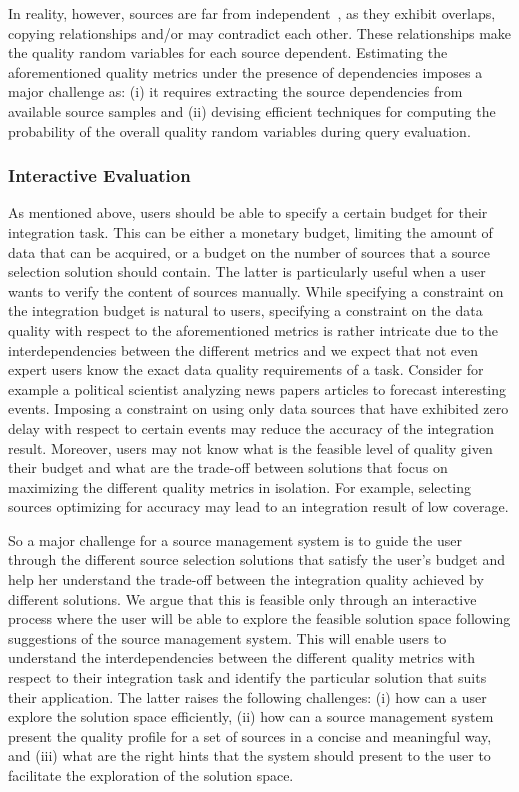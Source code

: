 \documentclass{sig-alternate}
\begin{document}
In reality, however, sources are far from independent~\cite{berti-equille:sailing, dong:2009}, as they exhibit overlaps, copying relationships and/or may contradict each other. These relationships make the quality random variables for each source dependent. Estimating the aforementioned quality metrics under the presence of dependencies imposes a major challenge as: (i) it  requires extracting the source dependencies from available source samples and (ii) devising efficient techniques for computing the probability of the overall quality random variables during query evaluation.

\subsubsection{Interactive Evaluation}
\label{sec:eval}
As mentioned above, users should be able to specify a certain budget for their integration task. This can be either a monetary budget, limiting the amount of data that can be acquired, or a budget on the number of sources that a source selection solution should contain. The latter is particularly useful when a user wants to verify the content of sources manually. While specifying a constraint on the integration budget is natural to users, specifying a constraint on the data quality with respect to the aforementioned metrics is rather intricate due to the interdependencies between the different metrics and we expect that not even expert users know the exact data quality requirements of a task. Consider for example a political scientist analyzing news papers articles to forecast interesting events. Imposing a constraint on using only data sources that have exhibited zero delay with respect to certain events may reduce the accuracy of the integration result. Moreover, users may not know what is the feasible level of quality given their budget and what are the trade-off between solutions that focus on maximizing the different quality metrics in isolation. For example, selecting sources optimizing for accuracy may lead to an integration result of low coverage.  

So a major challenge for a source management system is to guide the user through the different source selection solutions that satisfy the user's budget and help her understand the trade-off between the integration quality achieved by different solutions. We argue that this is feasible only through an interactive process where the user will be able to explore the feasible solution space following suggestions of the source management system. This will enable users to understand the interdependencies between the different quality metrics with respect to their integration task and identify the particular solution that suits their application. The latter raises the following challenges: (i) how can a user explore the solution space efficiently, (ii) how can a source management system present the quality profile for a set of sources in a concise and meaningful way, and (iii) what are the right hints that the system should present to the user to facilitate the exploration of the solution space. 
\end{document}
